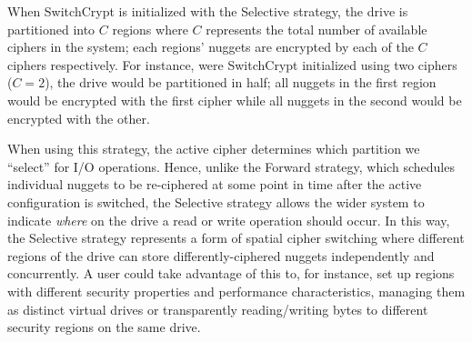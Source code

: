 
When SwitchCrypt is initialized with the
Selective strategy, the drive is partitioned into $C$ regions where $C$
represents the total number of available ciphers in the system; each regions'
nuggets are encrypted by each of the $C$ ciphers respectively. For instance,
were SwitchCrypt initialized using two ciphers ($C = 2$), the drive would be
partitioned in half; all nuggets in the first region would be encrypted with the
first cipher while all nuggets in the second would be encrypted with the other.

When using this strategy, the active cipher determines which partition we
``select'' for I/O operations. Hence, unlike the Forward strategy, which
schedules individual nuggets to be re-ciphered at some point in time after the
active configuration is switched, the Selective strategy allows the wider system
to indicate \emph{where} on the drive a read or write operation should occur. In
this way, the Selective strategy represents a form of spatial cipher switching
where different regions of the drive can store differently-ciphered nuggets
independently and concurrently. A user could take advantage of this to, for
instance, set up regions with different security properties and performance
characteristics, managing them as distinct virtual drives or transparently
reading/writing bytes to different security regions on the same drive.


